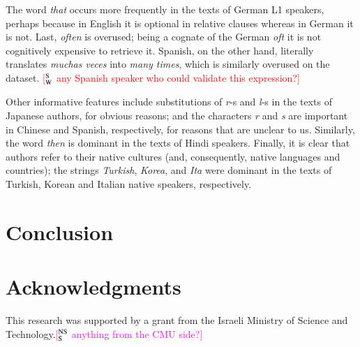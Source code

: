 \documentclass[11pt,letterpaper]{article}
\newcommand{\ensuretext}[1]{#1}
\newcommand{\nssmarker}{\ensuretext{\textcolor{magenta}{\ensuremath{^{\textsc{NS}}_{\textsc{S}}}}}}
\newcommand{\swmarker}{\ensuretext{\textcolor{red}{\ensuremath{^{\textsc{S}}_{\textsc{W}}}}}}
\newcommand{\arkcomment}[3]{\ensuretext{\textcolor{#3}{[#1 #2]}}}
\newcommand{\nss}[1]{\arkcomment{\nssmarker}{#1}{magenta}}
\newcommand{\sw}[1]{\arkcomment{\swmarker}{#1}{red}}
\newcommand{\textnl}{\textsl}
\begin{document}
The word \textnl{that} occurs more frequently in the texts of German
L1 speakers, perhaps because in English it is optional in relative
clauses whereas in German it is not.  Last, \textnl{often} is
overused; being a cognate of the German \textnl{oft} it is not
cognitively expensive to retrieve it. Spanish, on the other hand,
literally translates \textnl{muchas veces} into \textnl{many times},
which is similarly overused on the dataset. \sw{any Spanish speaker
  who could validate this expression?}

Other informative features include substitutions of \textnl{r}-s and
\textnl{l}-s in the texts of Japanese authors, for obvious reasons;
and the characters \textnl{r} and \textnl{s} are important in Chinese
and Spanish, respectively, for reasons that are unclear to
us. Similarly, the word \textnl{then} is dominant in the texts of
Hindi speakers. Finally, it is clear that authors refer to their
native cultures (and, consequently, native languages and countries);
the strings \textnl{Turkish}, \textnl{Korea}, and \textnl{Ita} were
dominant in the texts of Turkish, Korean and Italian native speakers,
respectively.

\section{Conclusion}
\label{sec:conclusion}

\section*{Acknowledgments}
This research was supported by a grant from the Israeli Ministry of
Science and Technology.\nss{anything from the CMU side?}




\end{document}
